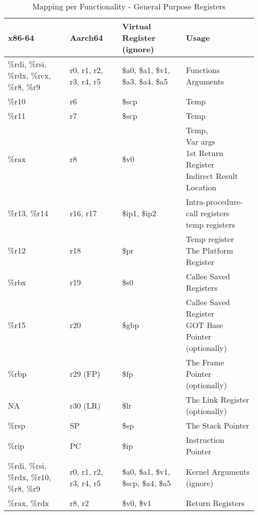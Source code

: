\documentclass[11pt]{article}
\begin{document}
\begin{table}[ht]
\caption{Mapping per Functionality - General Purpose Registers}
\begin{adjustwidth}{-4.3cm}{-4.3cm}
\begin{tabular}{|l|l|l|l|}
    \hline
    \textbf{x86-64} & \textbf{Aarch64} & \textbf{Virtual Register (ignore)} & \textbf{Usage} \\
    \hline
    \%rdi, \%rsi, \%rdx, \%rcx, \%r8, \%r9 & r0, r1, r2, r3, r4, r5 & \$a0, \$a1, \$v1, \$a3, \$a4, \$a5 & Functions Arguments \\
    \hline
    \%r10 & r6 & \$scp & Temp \\
    \hline
    \%r11 & r7 & \$scp & Temp \\
    \hline
    \%rax & r8 & \$v0 & \pbox{20cm}{Temp, \\  Var args \\ 1st Return Register \\ Indirect Result Location} \\
    \hline
    \%r13, \%r14 & r16, r17 & \$ip1, \$ip2 & \pbox{20cm}{Intra-procedure-call registers \\ temp registers} \\
    \hline
    \%r12 & r18 & \$pr & \pbox{20cm}{Temp register \\ The Platform Register} \\
    \hline
    \%rbx & r19 & \$s0 & Callee Saved Registers \\
    \hline
    \%r15 & r20 & \$gbp & \pbox{20cm}{Callee Saved Register \\ GOT Base Pointer (optionally)} \\
    \hline
    \%rbp & r29 (FP) & \$fp & The Frame Pointer (optionally) \\
    \hline
    NA & r30 (LR) & \$lr & The Link Register (optionally) \\
    \hline
    \%rsp & SP & \$sp & The Stack Pointer \\
    \hline
    \%rip & PC & \$ip & Instruction Pointer \\
    \hline
    \%rdi, \%rsi, \%rdx, \%r10, \%r8, \%r9 & r0, r1, r2, r3, r4, r5 & \$a0, \$a1, \$v1, \$scp, \$a4, \$a5 & Kernel Arguments (ignore)\\
    \hline
    \%rax, \%rdx & r8, r2 & \$v0, \$v1 & Return Registers \\
    \hline
\end{tabular}
\end{adjustwidth}\label{tab:mappings_per_func}
\end{table}
\end{document}
